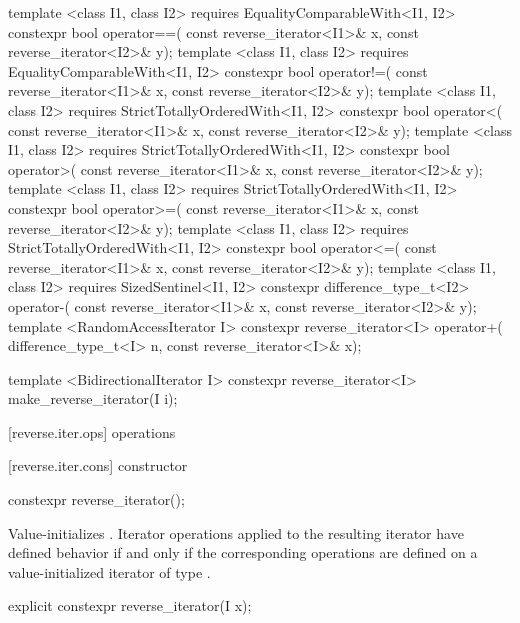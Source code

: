 \begin{codeblock}
{{{{  template <class I1, class I2>
      requires EqualityComparableWith<I1, I2>
    constexpr bool operator==(
      const reverse_iterator<I1>& x,
      const reverse_iterator<I2>& y);
  template <class I1, class I2>
      requires EqualityComparableWith<I1, I2>
    constexpr bool operator!=(
      const reverse_iterator<I1>& x,
      const reverse_iterator<I2>& y);
  template <class I1, class I2>
      requires StrictTotallyOrderedWith<I1, I2>
    constexpr bool operator<(
      const reverse_iterator<I1>& x,
      const reverse_iterator<I2>& y);
  template <class I1, class I2>
      requires StrictTotallyOrderedWith<I1, I2>
    constexpr bool operator>(
      const reverse_iterator<I1>& x,
      const reverse_iterator<I2>& y);
  template <class I1, class I2>
      requires StrictTotallyOrderedWith<I1, I2>
    constexpr bool operator>=(
      const reverse_iterator<I1>& x,
      const reverse_iterator<I2>& y);
  template <class I1, class I2>
      requires StrictTotallyOrderedWith<I1, I2>
    constexpr bool operator<=(
      const reverse_iterator<I1>& x,
      const reverse_iterator<I2>& y);
  template <class I1, class I2>
      requires SizedSentinel<I1, I2>
    constexpr difference_type_t<I2> operator-(
      const reverse_iterator<I1>& x,
      const reverse_iterator<I2>& y);
  template <RandomAccessIterator I>
    constexpr reverse_iterator<I> operator+(
      difference_type_t<I> n,
      const reverse_iterator<I>& x);

  template <BidirectionalIterator I>
    constexpr reverse_iterator<I> make_reverse_iterator(I i);
}}}}
\end{codeblock}

[reverse.iter.ops]{ operations}

[reverse.iter.cons]{ constructor}

%
\begin{itemdecl}
constexpr reverse_iterator();
\end{itemdecl}

\begin{itemdescr}
\pnum
\effects
Value-initializes
.
Iterator operations applied to the resulting iterator have defined behavior
if and only if the corresponding operations are defined on a
value-initialized iterator of type
.
\end{itemdescr}

%
\begin{itemdecl}
explicit constexpr reverse_iterator(I x);
\end{itemdecl}

